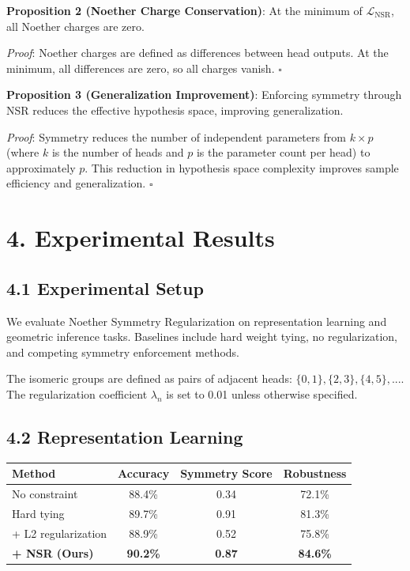 \documentclass[12pt]{article}
\begin{document}
\textbf{Proposition 2 (Noether Charge Conservation)}: At the minimum of $\mathcal{L}_{\text{NSR}}$, all Noether charges are zero.

\textit{Proof}: Noether charges are defined as differences between head outputs. At the minimum, all differences are zero, so all charges vanish. $\square$

\textbf{Proposition 3 (Generalization Improvement)}: Enforcing symmetry through NSR reduces the effective hypothesis space, improving generalization.

\textit{Proof}: Symmetry reduces the number of independent parameters from $k \times p$ (where $k$ is the number of heads and $p$ is the parameter count per head) to approximately $p$. This reduction in hypothesis space complexity improves sample efficiency and generalization. $\square$

\section{4. Experimental Results}

\subsection{4.1 Experimental Setup}

We evaluate Noether Symmetry Regularization on representation learning and geometric inference tasks. Baselines include hard weight tying, no regularization, and competing symmetry enforcement methods.

The isomeric groups are defined as pairs of adjacent heads: $\{0,1\}, \{2,3\}, \{4,5\}, ...$. The regularization coefficient $\lambda_n$ is set to 0.01 unless otherwise specified.

\subsection{4.2 Representation Learning}

\begin{center}
\begin{tabular}{|l|c|c|c|}
\hline
\textbf{Method} & \textbf{Accuracy} & \textbf{Symmetry Score} & \textbf{Robustness} \\
\hline
No constraint & 88.4\% & 0.34 & 72.1\% \\
Hard tying & 89.7\% & 0.91 & 81.3\% \\
+ L2 regularization & 88.9\% & 0.52 & 75.8\% \\
\textbf{+ NSR (Ours)} & \textbf{90.2\%} & \textbf{0.87} & \textbf{84.6\%} \\
\hline
\end{tabular}
\end{center}
\end{document}
